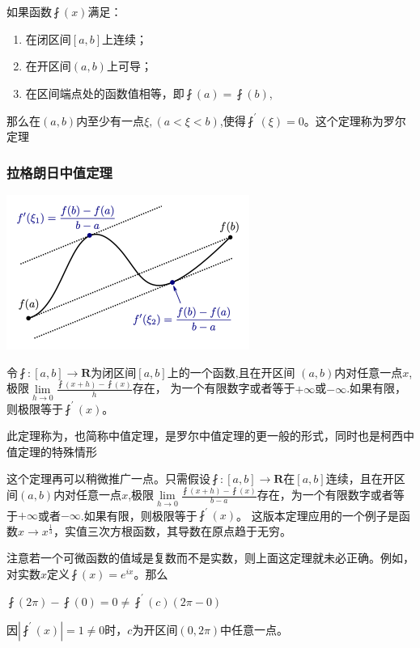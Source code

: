 \documentclass[UTF8]{ctexbook}
\newcommand{\limNormal}[1]{\lim\limits_{#1}}
\newcommand{\derivative}{^\prime}
\newcommand{\fDerivative}[1]{\fint\derivative(#1)}
\newcommand{\defFunction}[1]{\fint(#1)}
\begin{document}
{{{{  如果函数$\fint(x)$满足：

  \begin{enumerate}
    \item 在闭区间$[a,b]$上连续；
    \item 在开区间$(a,b)$上可导；
    \item 在区间端点处的函数值相等，即$\fint(a) = \fint(b)$,
  \end{enumerate}

  那么在$(a,b)$内至少有一点$\xi, (a<\xi<b)$,使得$\fint\derivative(\xi) = 0$。这个定理称为罗尔定理
}%

\subsubsection{拉格朗日中值定理}{
\includegraphics{resources/Lagrange's_mean_value_theorem.png}

令$\fint : [a,b] \to \mathbf{R}$为闭区间$[a,b]$上的一个函数,且在开区间
$(a,b)$内对任意一点$x$,极限$\limNormal{h \to 0}\frac{\fint(x + h) - \fint(x)}{h}$存在，
为一个有限数字或者等于$+\infty$或$-\infty$.如果有限，则极限等于$\fDerivative{x}$。

此定理称为{}，也简称中值定理，是罗尔中值定理的更一般的形式，同时也是柯西中值定理的特殊情形

这个定理再可以稍微推广一点。只需假设$\fint : [a,b] \to \mathbf{R}$在$[a,b]$连续，且在开区间$(a,b)$内对任意一点$x$,极限$\limNormal{h \to 0}
  \frac{\defFunction{x + h} - \defFunction{x}}{b - a}$存在，为一个有限数字或者等于$+\infty$或者$-\infty$.如果有限，则极限等于$\fDerivative{x}$。
这版本定理应用的一个例子是函数$x \to x^{\frac{1}{3}}$，实值三次方根函数，其导数在原点趋于无穷。

注意若一个可微函数的值域是复数而不是实数，则上面这定理就未必正确。例如，对实数$x$定义$\defFunction{x} = e^{ix}$。那么

$\defFunction{2\pi} - \defFunction{0} = 0 \neq \fDerivative{c}(2\pi - 0)$

因$|\fDerivative{x}| = 1 \neq 0$时，$c$为开区间$(0,2\pi)$中任意一点。
}%

}}}
\end{document}
